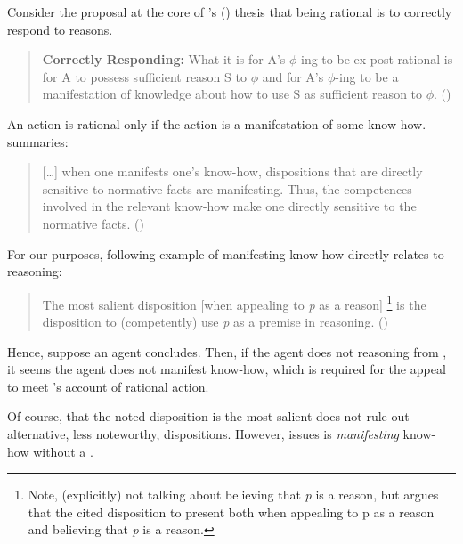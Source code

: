 \begin{note}
  Consider the proposal at the core of \citeauthor{Lord:2018aa}'s (\citeyear{Lord:2018aa}) thesis that being rational is to correctly respond to reasons.

  \begin{quote}
    \textbf{Correctly Responding:} What it is for A's \(\phi\)-ing to be ex post rational is for A to possess sufficient reason S to \(\phi\) and for A's \(\phi\)-ing to be a manifestation of knowledge about how to use S as sufficient reason to \(\phi\).%
    \mbox{}\hfill\mbox{(\citeyear[143]{Lord:2018aa})}
  \end{quote}

  An \agents{} action is rational only if the action is a manifestation of some know-how.
  \citeauthor{Lord:2018aa} summaries:

  \begin{quote}
    [\dots] when one manifests one's know-how, dispositions that are directly sensitive to normative facts are manifesting. Thus, the competences involved in the relevant know-how make one directly sensitive to the normative facts.%
    \mbox{}\hfill\mbox{(\citeyear[16]{Lord:2018aa})}
  \end{quote}

  For our purposes, following example of manifesting know-how directly relates to reasoning:

  \begin{quote}
    The most salient disposition [when appealing to \emph{p} as a reason]%
    \footnote{
      Note, \citeauthor{Lord:2018aa} (explicitly) not talking about believing that \emph{p} is a reason, but argues that the cited disposition to present both when appealing to p as a reason and believing that \emph{p} is a reason.
    }
    is the disposition to (competently) use \emph{p} as a premise in reasoning.%
    \mbox{}\hfill\mbox{(\citeyear[25]{Lord:2018aa})}
  \end{quote}

  Hence, suppose an agent concludes.
  Then, if the agent does not \wit{} reasoning from \pool{}, it seems the agent does not manifest know-how, which is required for the appeal to meet \citeauthor{Lord:2018aa}'s account of rational action.

  Of course, that the noted disposition is the most salient does not rule out alternative, less noteworthy, dispositions.
  However, issues is \emph{manifesting} know-how without a \wit{}.
\end{note}

